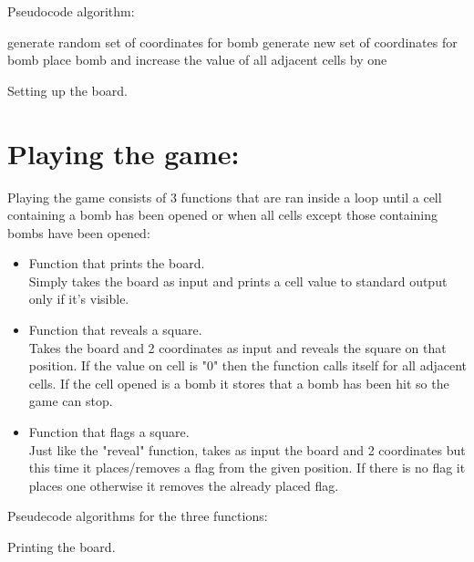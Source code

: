 \documentclass{report}
\begin{document}
Pseudocode algorithm:

\begin{algorithm}[H]
     {
        generate random set of coordinates for bomb\;
         {
            generate new set of coordinates for bomb\;
        }{
            place bomb and increase the value of all adjacent cells by one\;
        }
    }
    \caption{Setting up the board.}
\end{algorithm}

\section*{Playing the game:}
Playing the game consists of 3 functions that are ran inside a loop until a cell containing a bomb has been opened or when all cells except those
containing bombs have been opened:
\begin{itemize}
    \item Function that prints the board.\\
    Simply takes the board as input and prints a cell value to standard output only if it's visible.
    \item Function that reveals a square.\\
    Takes the board and 2 coordinates as input and reveals the square on that position. If the value on cell is "0" then the function calls
    itself for all adjacent cells. If the cell opened is a bomb it stores that a bomb has been hit so the game can stop.
    \item Function that flags a square.\\
    Just like the "reveal" function, takes as input the board and 2 coordinates but this time it places/removes a flag from the given position.
    If there is no flag it places one otherwise it removes the already placed flag.
\end{itemize}

Pseudecode algorithms for the three functions:

\begin{algorithm}[H]
    \caption{Printing the board.}
\end{algorithm}
\end{document}
